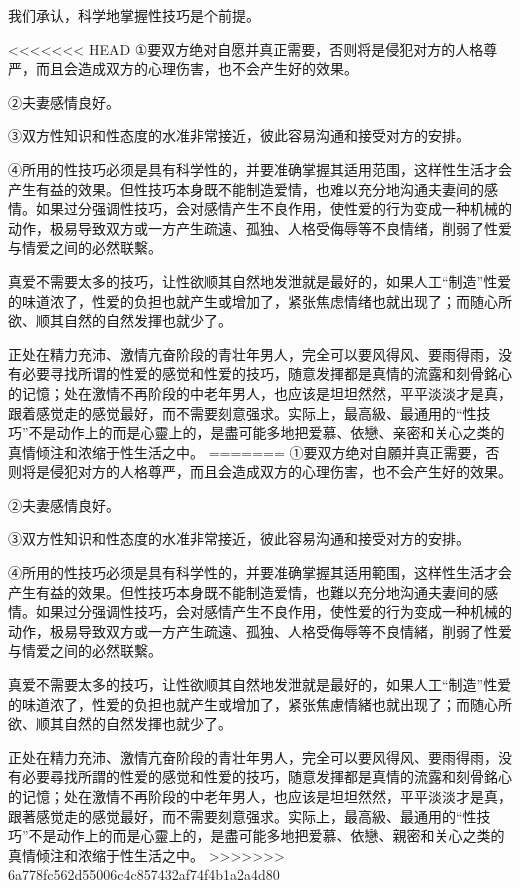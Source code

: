 \documentclass[12pt,UTF8]{ctexbook}
\begin{document}
我们承认，科学地掌握性技巧是个前提。

<<<<<<< HEAD
①要双方绝对自愿并真正需要，否则将是侵犯对方的人格尊严，而且会造成双方的心理伤害，也不会产生好的效果。

②夫妻感情良好。

③双方性知识和性态度的水准非常接近，彼此容易沟通和接受对方的安排。

④所用的性技巧必须是具有科学性的，并要准确掌握其适用范围，这样性生活才会产生有益的效果。但性技巧本身既不能制造爱情，也难以充分地沟通夫妻间的感情。如果过分强调性技巧，会对感情产生不良作用，使性爱的行为变成一种机械的动作，极易导致双方或一方产生疏遠、孤独、人格受侮辱等不良情绪，削弱了性爱与情爱之间的必然联繫。

真爱不需要太多的技巧，让性欲顺其自然地发泄就是最好的，如果人工“制造”性爱的味道浓了，性爱的负担也就产生或增加了，紧张焦虑情绪也就出现了；而随心所欲、顺其自然的自然发揮也就少了。

正处在精力充沛、激情亢奋阶段的青壮年男人，完全可以要风得风、要雨得雨，没有必要寻找所谓的性爱的感觉和性爱的技巧，随意发揮都是真情的流露和刻骨銘心的记憶；处在激情不再阶段的中老年男人，也应该是坦坦然然，平平淡淡才是真，跟着感觉走的感觉最好，而不需要刻意强求。实际上，最高級、最通用的“性技巧”不是动作上的而是心靈上的，是盡可能多地把爱慕、依戀、亲密和关心之类的真情倾注和浓缩于性生活之中。
=======
①要双方绝对自願并真正需要，否则将是侵犯对方的人格尊严，而且会造成双方的心理伤害，也不会产生好的效果。

②夫妻感情良好。

③双方性知识和性态度的水准非常接近，彼此容易沟通和接受对方的安排。

④所用的性技巧必须是具有科学性的，并要准确掌握其适用範围，这样性生活才会产生有益的效果。但性技巧本身既不能制造爱情，也難以充分地沟通夫妻间的感情。如果过分强调性技巧，会对感情产生不良作用，使性爱的行为变成一种机械的动作，极易导致双方或一方产生疏遠、孤独、人格受侮辱等不良情緒，削弱了性爱与情爱之间的必然联繫。

真爱不需要太多的技巧，让性欲顺其自然地发泄就是最好的，如果人工“制造”性爱的味道浓了，性爱的负担也就产生或增加了，紧张焦慮情緒也就出现了；而随心所欲、顺其自然的自然发揮也就少了。

正处在精力充沛、激情亢奋阶段的青壮年男人，完全可以要风得风、要雨得雨，没有必要尋找所謂的性爱的感觉和性爱的技巧，随意发揮都是真情的流露和刻骨銘心的记憶；处在激情不再阶段的中老年男人，也应该是坦坦然然，平平淡淡才是真，跟著感觉走的感觉最好，而不需要刻意强求。实际上，最高級、最通用的“性技巧”不是动作上的而是心靈上的，是盡可能多地把爱慕、依戀、親密和关心之类的真情倾注和浓缩于性生活之中。
>>>>>>> 6a778fc562d55006c4c857432af74f4b1a2a4d80
\end{document}
